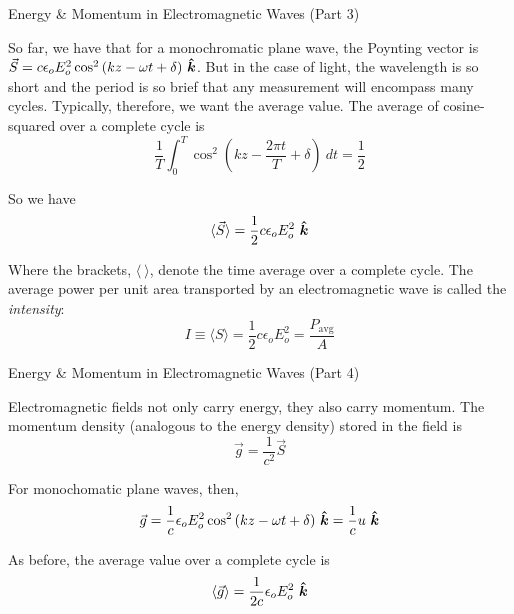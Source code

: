\documentclass{beamer}
\begin{document}
\begin{frame}{Energy \& Momentum in Electromagnetic Waves (Part 3)}

So far, we have that for a monochromatic plane wave, the Poynting vector is $\vec{S} = c \epsilon_o E_o^2 \cos^2{\left( kz - \omega t + \delta \right)}\ \bm{\hat{k}}$. But in the case of light, the wavelength is so short and the period is so brief that any measurement will encompass many cycles. Typically, therefore, we want the average value. The average of cosine-squared over a complete cycle is
\begin{equation*}
    \frac{1}{T} \int_0^T \cos^2{\left( kz - \frac{2\pi t}{T} + \delta \right)}\ dt = \frac{1}{2}
\end{equation*}

So we have
\begin{equation*}
    \langle \vec{S} \rangle = \frac{1}{2} c \epsilon_o E_o^2\ \bm{\hat{k}}
\end{equation*}

Where the brackets, $\langle\ \rangle$, denote the time average over a complete cycle. The average power per unit area transported by an electromagnetic wave is called the \emph{intensity}:
\begin{equation*}
    I \equiv \langle S \rangle = \frac{1}{2} c \epsilon_o E_o^2 = \frac{P_{\text{avg}}}{A}
\end{equation*}

\end{frame}

\begin{frame}{Energy \& Momentum in Electromagnetic Waves (Part 4)}

Electromagnetic fields not only carry energy, they also carry momentum. The momentum density (analogous to the energy density) stored in the field is
\begin{equation*}
    \vec{g} = \frac{1}{c^2} \vec{S}
\end{equation*}

For monochomatic plane waves, then,
\begin{equation*}
    \vec{g} = \frac{1}{c} \epsilon_o E_o^2 \cos^2{\left( kz - \omega t + \delta \right)}\ \khat = \frac{1}{c} u\ \khat
\end{equation*}

As before, the average value over a complete cycle is
\begin{equation*}
    \langle \vec{g} \rangle = \frac{1}{2c} \epsilon_o E_o^2\ \bm{\hat{k}}
\end{equation*}

\end{frame}
\end{document}

